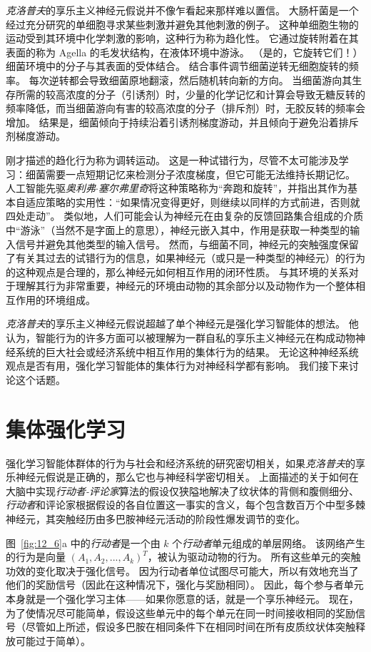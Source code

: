 \textit{克洛普夫}的享乐主义神经元假说并不像乍看起来那样难以置信。
大肠杆菌是一个经过充分研究的单细胞寻求某些刺激并避免其他刺激的例子。
这种单细胞生物的运动受到其环境中化学刺激的影响，这种行为称为趋化性。
它通过旋转附着在其表面的称为 Agella 的毛发状结构，在液体环境中游泳。 （是的，它旋转它们！）细菌环境中的分子与其表面的受体结合。
结合事件调节细菌逆转无细胞旋转的频率。
每次逆转都会导致细菌原地翻滚，然后随机转向新的方向。
当细菌游向其生存所需的较高浓度的分子（引诱剂）时，少量的化学记忆和计算会导致无糖反转的频率降低，而当细菌游向有害的较高浓度的分子（排斥剂）时，无胶反转的频率会增加。
结果是，细菌倾向于持续沿着引诱剂梯度游动，并且倾向于避免沿着排斥剂梯度游动。


刚才描述的趋化行为称为调转运动。
这是一种试错行为，尽管不太可能涉及学习：细菌需要一点短期记忆来检测分子浓度梯度，但它可能无法维持长期记忆。
人工智能先驱\textit{奥利弗$\cdot$塞尔弗里奇}将这种策略称为“奔跑和旋转”，并指出其作为基本自适应策略的实用性：“如果情况变得更好，则继续以同样的方式前进，否则就四处走动”\cite{selfridge1978tracking,selfridge1984some}。
类似地，人们可能会认为神经元在由复杂的反馈回路集合组成的介质中“游泳”（当然不是字面上的意思），神经元嵌入其中，作用是获取一种类型的输入信号并避免其他类型的输入信号。
然而，与细菌不同，神经元的突触强度保留了有关其过去的试错行为的信息，如果神经元（或只是一种类型的神经元）的行为的这种观点是合理的，那么神经元如何相互作用的闭环性质。
与其环境的关系对于理解其行为非常重要，神经元的环境由动物的其余部分以及动物作为一个整体相互作用的环境组成。


\textit{克洛普夫}的享乐主义神经元假说超越了单个神经元是强化学习智能体的想法。
他认为，智能行为的许多方面可以被理解为一群自私的享乐主义神经元在构成动物神经系统的巨大社会或经济系统中相互作用的集体行为的结果。
无论这种神经系统观点是否有用，强化学习智能体的集体行为对神经科学都有影响。
我们接下来讨论这个话题。


\section{集体强化学习} \label{sec:collective_rl}

强化学习智能体群体的行为与社会和经济系统的研究密切相关，如果\textit{克洛普夫}的享乐神经元假说是正确的，那么它也与神经科学密切相关。
上面描述的关于如何在大脑中实现\textit{行动者-评论家}算法的假设仅狭隘地解决了纹状体的背侧和腹侧细分、\textit{行动者}和评论家根据假设的各自位置这一事实的含义，每个包含数百万个中型多棘神经元，其突触经历由多巴胺神经元活动的阶段性爆发调节的变化。


图~\ref{fig:12_6}a 中的\textit{行动者}是一个由 $k$ 个\textit{行动者}单元组成的单层网络。
该网络产生的行为是向量 $(A_1, A_2, ..., A_k) ^T$，被认为驱动动物的行为。
所有这些单元的突触功效的变化取决于强化信号。
因为行动者单位试图尽可能大，所以有效地充当了他们的奖励信号（因此在这种情况下，强化与奖励相同）。
因此，每个参与者单元本身就是一个强化学习主体——如果你愿意的话，就是一个享乐神经元。
现在，为了使情况尽可能简单，假设这些单元中的每个单元在同一时间接收相同的奖励信号（尽管如上所述，假设多巴胺在相同条件下在相同时间在所有皮质纹状体突触释放可能过于简单）。


